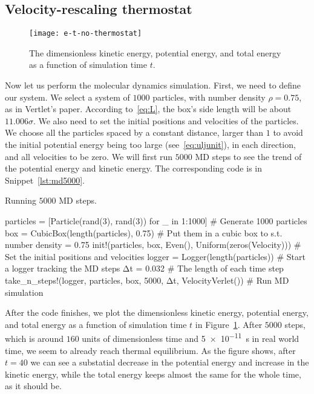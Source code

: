 \subsection{Velocity-rescaling thermostat}

\begin{figure}[H]
    \centering
    \texttt{[image: e-t-no-thermostat]}
    \caption{The dimensionless kinetic energy, potential energy, and total energy
        as a function of simulation time $t$.}
    \label{fig:md5000}
\end{figure}

Now let us perform the molecular dynamics simulation.
First, we need to define our system. We select a system of $1000$ particles,
with number density $\rho = 0.75$, as in Vertlet\cite{Verlet}'s paper.
According to~\eqref{eq:L}, the box's side length will be about $11.006 \sigma$.
We also need to set the initial positions and velocities of the particles.
We choose all the particles spaced by a constant distance, larger than $1$
to avoid the initial potential energy being too large (see~\eqref{eq:uljunit}),
in each direction, and all velocities to be zero.
We will first run $5000$ MD steps to see the trend of the potential energy
and kinetic energy.
The corresponding code is in Snippet~\ref{lst:md5000}.

\begin{algorithm}[H]
    \caption{Running $5000$ MD steps.}
    \label{lst:md5000}
    \begin{juliacode}
        particles = [Particle(rand(3), rand(3)) for _ in 1:1000]  # Generate 1000 particles
        box = CubicBox(length(particles), 0.75)  # Put them in a cubic box to s.t. number density = 0.75
        init!(particles, box, Even(), Uniform(zeros(Velocity)))  # Set the initial positions and velocities
        logger = Logger(length(particles))  # Start a logger tracking the MD steps
        Δt = 0.032  # The length of each time step
        take_n_steps!(logger, particles, box, 5000, Δt, VelocityVerlet())  # Run MD simulation
    \end{juliacode}
\end{algorithm}

After the code finishes, we plot the dimensionless kinetic energy, potential energy,
and total energy as a function of simulation time $t$ in Figure~\ref{fig:md5000}.
After $5000$ steps, which is around $160$ units of dimensionless time and
\qty{5e-11}{\second} in real world time, we seem to already reach thermal equilibrium.
As the figure shows, after $t = 40$ we can see a substatial decrease in the potential energy
and increase in the kinetic energy, while the total energy keeps almost the same for
the whole time, as it should be.

